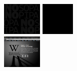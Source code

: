 \documentclass{acm_proc_article-sp}
\newcommand{\thumbheight}{16mm}
\newcommand{\newstrip}{\\[1mm]}
\newenvironment{thumbsequence}{}{\makebox[4mm]{}}
\begin{document}
\begin{figure}
\begin{centering}
	\begin{thumbsequence}
		\includegraphics[height=\thumbheight]{resources/sopa/looseduplicate7.png}
		\includegraphics[height=\thumbheight]{resources/sopa/looseduplicate8.jpg}
	\end{thumbsequence}
	\newstrip
	\begin{thumbsequence}
		\includegraphics[height=\thumbheight]{resources/sopa/looseduplicate9.png}

\end{thumbsequence}
\end{centering}
\end{figure}
\end{document}
